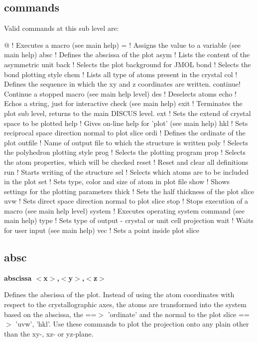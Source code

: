 \subsection*{commands}
Valid commands at this sub level are: 
\par
\begin{MacVerbatim}
@       ! Executes a macro (see main help)
=       ! Assigns the value to a variable (see main help)
absc    ! Defines the abscissa of the plot
asym    ! Lists the content of the asymmetric unit
back    ! Selects the plot background for JMOL
bond    ! Selects the bond plotting style
chem    ! Lists all type of atoms present in the crystal
col     ! Defines the sequence in which the xy and z coordinates are written.
continue! Continue a stopped macro (see main help level)
des     ! Deselects atoms
echo    ! Echos a string, just for interactive check (see main help)
exit    ! Terminates the plot sub level, returns to the main DISCUS level.
ext     ! Sets the extend of crystal space to be plotted
help    ! Gives on-line help for 'plot' (see main help)
hkl     ! Sets reciprocal space direction normal to plot slice
ordi    ! Defines the ordinate of the plot
outfile ! Name of output file to which the structure is written
poly    ! Selects the polyhedron plotting style
prog    ! Selects the plotting program
prop    ! Selects the atom properties, which will be checked
reset   ! Reset and clear all definitions
run     ! Starts writing of the structure
sel     ! Selects which atoms are to be included in the plot
set     ! Sets type, color and size of atom in plot file
show    ! Shows settings for the plotting parameters
thick   ! Sets the half thickness of the plot slice
uvw     ! Sets direct space direction normal to plot slice
stop    ! Stops execution of a macro (see main help level)
system  ! Executes operating system command (see main help)
type    ! Sets type of output - crystal or unit cell projection
wait    ! Waits for user input (see main help)
vec     ! Sets a point inside plot slice
\end{MacVerbatim}
\subsection*{absc}
{\bf abscissa $ <$x$> $,$ <$y$> $,$ <$z$> $ \par }
\par
\vspace{3pt}
Defines the abscissa of the plot. 
Instead of using the atom coordinates with respect to the crystallographic 
axes, the atoms are transformed into the system based on the abscissa, 
the ==$> $ 'ordinate' and the normal to the plot slice ==$> $ 'uvw', 'hkl'. 
Use these commands to plot the projection onto any plain other than the 
xy-, xz- or yz-plane. 
